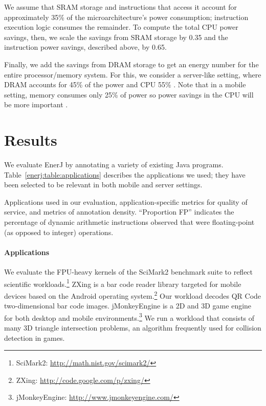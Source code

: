 We assume that SRAM storage and instructions that access it account
for approximately 35\% of the microarchitecture's power consumption;
instruction execution logic consumes the remainder. To compute the
total CPU power savings, then, we scale the savings from SRAM storage
by 0.35 and the instruction power savings, described above, by 0.65.

Finally, we add the savings from DRAM storage to get an energy number for the
entire processor/memory system. For this, we consider a server-like setting,
where DRAM accounts for 45\% of the power and CPU 55\% \cite{googlepower}. Note
that in a mobile setting, memory consumes only 25\% of power so power savings in
the CPU will be more important \cite{carroll2010}.

\section{Results}
\label{enerj:sec:res}

We evaluate EnerJ by annotating a variety of existing Java
programs. Table~\ref{enerj:table:applications} describes the applications we
used; they have been selected to be relevant in both mobile and server
settings. %

\begin{table}
\footnotesize
\makebox[\textwidth][c]{%
%
}
\caption{Applications used in our evaluation,
application-specific metrics for quality of service, and
metrics of annotation density. ``Proportion FP''
indicates the percentage of dynamic arithmetic instructions observed that were
floating-point (as opposed to integer) operations.
}
\label{enerj:table:applications}
\end{table}

\paragraph{Applications} We evaluate the FPU-heavy kernels of the SciMark2 benchmark suite to
reflect scientific workloads.\footnote{SciMark2:
  \url{http://math.nist.gov/scimark2/}} ZXing is a bar code reader library
targeted for mobile devices based on the Android operating
system.\footnote{ZXing: \url{http://code.google.com/p/zxing/}} Our workload
decodes QR Code two-dimensional bar code images. jMonkeyEngine is a 2D
and 3D game engine for both desktop and mobile
environments.\footnote{jMonkeyEngine: \url{http://www.jmonkeyengine.com/}}
We run a workload that consists of many 3D triangle intersection
problems, an algorithm frequently used for collision detection in
games.

